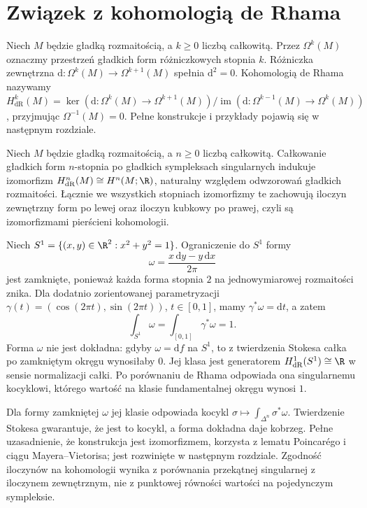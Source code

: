 \section{Związek z kohomologią de Rhama}

\begin{definicja}
Niech $M$ będzie gładką rozmaitością,
a $k\geq0$ liczbą całkowitą. Przez $\Omega^k(M)$
oznaczmy przestrzeń gładkich form różniczkowych stopnia $k$. Różniczka zewnętrzna
$\mathrm d:\Omega^k(M)\to\Omega^{k+1}(M)$ spełnia $\mathrm d^2=0$.
Kohomologią de Rhama nazywamy
$H^k_{\mathrm{dR}}(M)=\ker(\mathrm d:\Omega^k(M)\to\Omega^{k+1}(M))
/\operatorname{im}(\mathrm d:\Omega^{k-1}(M)\to\Omega^k(M))$,
przyjmując $\Omega^{-1}(M)=0$. Pełne konstrukcje i przykłady
pojawią się w następnym rozdziale.
\end{definicja}

\begin{twierdzenie}
Niech $M$ będzie gładką rozmaitością,
a $n\geq0$ liczbą całkowitą. Całkowanie
gładkich form $n$-stopnia po gładkich sympleksach singularnych
indukuje izomorfizm
$H^n_{\mathrm{dR}}(M)\cong H^n(M;\R)$,
naturalny względem odwzorowań gładkich rozmaitości.
Łącznie we wszystkich stopniach izomorfizmy te zachowują
iloczyn zewnętrzny form po lewej oraz iloczyn kubkowy
po prawej, czyli są izomorfizmami pierścieni kohomologii.
\end{twierdzenie}

\begin{przyklad}
\label{prz:de-rham-okrag-explicit}
Niech $S^1=\{(x,y)\in\R^2:x^2+y^2=1\}$.
Ograniczenie do $S^1$ formy
\[
 \omega=\frac{x\,\mathrm dy-y\,\mathrm dx}{2\pi}
\]
jest zamknięte, ponieważ każda forma stopnia $2$
na jednowymiarowej rozmaitości znika.
Dla dodatnio zorientowanej parametryzacji
$\gamma(t)=(\cos(2\pi t),\sin(2\pi t))$, $t\in[0,1]$,
mamy $\gamma^*\omega=\mathrm dt$, a zatem
\[
 \int_{S^1}\omega=\int_{[0,1]}\gamma^*\omega=1.
\]
Forma $\omega$ nie jest dokładna:
gdyby $\omega=\mathrm df$ na $S^1$,
to z twierdzenia Stokesa całka po zamkniętym
okręgu wynosiłaby $0$. Jej klasa jest
generatorem $H^1_{\mathrm{dR}}(S^1)\cong\R$
w sensie normalizacji całki.
Po porównaniu de Rhama odpowiada ona
singularnemu kocyklowi, którego wartość
na klasie fundamentalnej okręgu wynosi $1$.
\end{przyklad}

\begin{uwaga}
Dla formy zamkniętej $\omega$ jej klasie odpowiada kocykl
$\sigma\mapsto\int_{\Delta^n}\sigma^*\omega$.
Twierdzenie Stokesa gwarantuje, że jest to kocykl,
a forma dokładna daje kobrzeg. Pełne uzasadnienie, że
konstrukcja jest izomorfizmem, korzysta z lematu Poincarégo
i ciągu Mayera--Vietorisa; jest rozwinięte w następnym
rozdziale. Zgodność iloczynów na kohomologii wynika z
porównania przekątnej singularnej z iloczynem zewnętrznym,
nie z punktowej równości wartości na pojedynczym sympleksie.
\end{uwaga}

